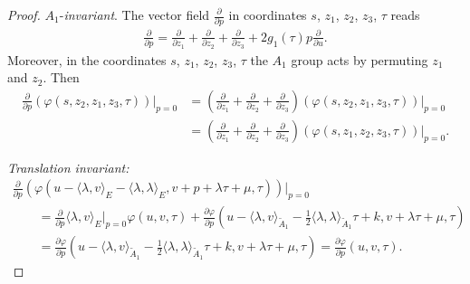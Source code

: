 \documentclass[10pt,a4paper]{amsart}
\numberwithin{equation}{section}
\begin{document}
\begin{proof}
$A_1$-\emph{invariant}.
The vector field $\frac{\partial}{\partial p}$ in coordinates $s$, $z_1$, $z_2$, $z_3$, $\tau$ reads
\begin{gather*}
\frac{\partial}{\partial p}=\frac{\partial}{\partial z_1}+\frac{\partial}{\partial z_2}+\frac{\partial}{\partial z_3}+2g_1(\tau)p\frac{\partial}{\partial u}.
\end{gather*}
Moreover, in the coordinates $s$, $z_1$, $z_2$, $z_3$, $\tau$ the $A_1$ group acts by permuting $z_1$ and $z_2$. Then
\begin{align*}
\frac{\partial}{\partial p}(\varphi(s,z_2,z_1,z_3,\tau))\bigg|_{p=0} &=\left(\frac{\partial}{\partial z_1}+\frac{\partial}{\partial z_2}+\frac{\partial}{\partial z_3}\right)( \varphi(s,z_2,z_1,z_3,\tau))\bigg|_{p=0}
\\
&=\left(\frac{\partial}{\partial z_1}+\frac{\partial}{\partial z_2}+\frac{\partial}{\partial z_3}\right) ( \varphi(s,z_1,z_2,z_3,\tau))\bigg|_{p=0}.
\end{align*}

\emph{Translation invariant:}
\begin{gather*}
\frac{\partial}{\partial p}\left(\varphi(u-\langle \lambda, v\rangle_E-\langle \lambda,\lambda \rangle_E,v+p+\lambda\tau+\mu,\tau)\right)\bigg |_{p=0}
\\ \qquad
{}=\frac{\partial}{\partial p} \langle \lambda, v\rangle_E \bigg |_{p=0}\varphi(u,v,\tau)+\frac{\partial \varphi}{\partial p}\left(u-\langle \lambda,v \rangle_{\tilde A_1}-\frac{1}{2}\langle \lambda,\lambda \rangle_{\tilde A_1}\tau+k,v+\lambda\tau+\mu,\tau\right)
\\ \qquad
{}=\frac{\partial \varphi}{\partial p}\left(u-\langle \lambda,v \rangle_{\tilde A_1}-\frac{1}{2}\langle \lambda,\lambda \rangle_{\tilde A_1}\tau+k,v+\lambda\tau+\mu,\tau\right)
=\frac{\partial \varphi}{\partial p}(u,v,\tau).
\end{gather*}


\end{proof}
\end{document}
